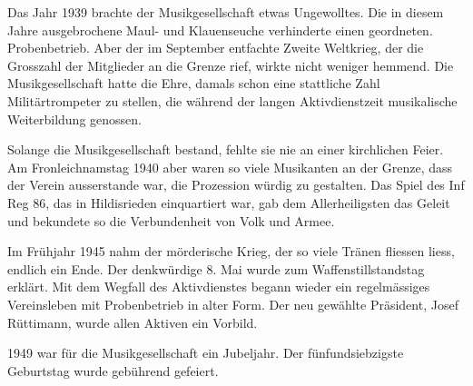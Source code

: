 \begin{history}
    Das Jahr 1939 brachte der Musikgesellschaft etwas Ungewolltes. Die in diesem
    Jahre ausgebrochene Maul- und Klauenseuche verhinderte einen geordneten.
    Probenbetrieb. Aber der im September entfachte Zweite Weltkrieg, der die
    Grosszahl der Mitglieder an die Grenze rief, wirkte nicht weniger hemmend.
    Die Musikgesellschaft hatte die Ehre, damals schon eine stattliche Zahl
    Militärtrompeter zu stellen, die während der langen Aktivdienstzeit
    musikalische Weiterbildung genossen.

    Solange die Musikgesellschaft bestand, fehlte sie nie an einer kirchlichen
    Feier. Am Fronleichnamstag 1940 aber waren so viele Musikanten an der
    Grenze, dass der Verein ausserstande war, die Prozession würdig zu
    gestalten. Das Spiel des Inf Reg 86, das in Hildisrieden einquartiert war,
    gab dem Allerheiligsten das Geleit und bekundete so die Verbundenheit von
    Volk und Armee.

    Im Frühjahr 1945 nahm der mörderische Krieg, der so viele Tränen fliessen
    liess, endlich ein Ende. Der denkwürdige 8. Mai wurde zum
    Waffenstillstandstag erklärt. Mit dem Wegfall des Aktivdienstes begann
    wieder ein regelmässiges Vereinsleben mit Probenbetrieb in alter Form. Der
    neu gewählte Präsident, Josef Rüttimann, wurde allen Aktiven ein Vorbild.

    1949 war für die Musikgesellschaft ein Jubeljahr. Der fünfundsiebzigste
    Geburtstag wurde gebührend gefeiert.


\end{history}
